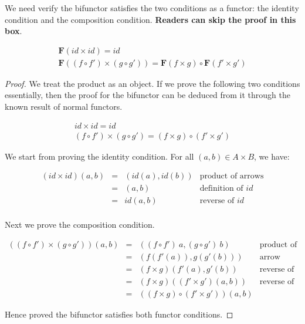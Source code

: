 \documentclass{article}
\begin{document}
\begin{mdframed}
We need verify the bifunctor satisfies the two conditions as a functor: the identity condition and the composition condition. \textbf{Readers can skip the proof in this box}.

\[
\begin{array}{l}
\mathbf{F}(id \times id) = id \\
\mathbf{F}((f \circ f') \times (g \circ g')) = \mathbf{F}(f \times g) \circ \mathbf{F} (f' \times g')
\end{array}
\]

\begin{proof}
We treat the product as an object. If we prove the following two conditions essentially, then the proof for the bifunctor can be deduced from it through the known result of normal functors.

\[
\begin{array}{l}
id \times id = id \\
(f \circ f') \times (g \circ g') = (f \times g) \circ (f' \times g')
\end{array}
\]

We start from proving the identity condition. For all $(a, b) \in A \times B$, we have:

\[
\begin{array}{rcll}
(id \times id)(a, b) & = & (id(a), id(b)) & \text{product of arrows} \\
                     & = & (a, b) & \text{definition of $id$} \\
                     & = & id(a, b) & \text{reverse of $id$} \\
\end{array}
\]

Next we prove the composition condition.

\[
\begin{array}{rcll}
((f \circ f') \times (g \circ g'))(a, b) & = & ((f \circ f')\ a, (g \circ g')\ b) & \text{product of arrows} \\
    & = & (f(f'(a)), g(g'(b))) & \text{arrow composition} \\
    & = & (f \times g)(f'(a), g'(b)) & \text{reverse of arrows product} \\
    & = & (f \times g)((f' \times g')(a, b)) & \text{reverse of arrows product} \\
    & = & ((f \times g) \circ (f' \times g'))(a, b)
\end{array}
\]

Hence proved the bifunctor satisfies both functor conditions.
\end{proof}
\end{mdframed}
\end{document}
